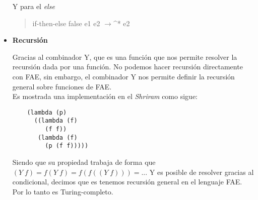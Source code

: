 \documentclass[12pt]{article}
\begin{document}
\begin{itemize}
  Y para el \textit{else} \\
  \begin{quote}
  if-then-else false e1 e2 $\to$^* \;\; e2\par
  \end{quote}
\item \textbf{Recursión}\par
  Gracias al combinador Y, que es una función que nos permite resolver la recursión dada por una función. No podemos hacer recursión directamente
  con FAE, sin embargo, el combinador Y nos permite definir la recursión general sobre funciones de FAE.\\
  Es mostrada una implementación en el \textit{Shriram} como sigue: \par
\begin{verbatim}
    (lambda (p)
      ((lambda (f)
         (f f))
       (lambda (f)
         (p (f f)))))
\end{verbatim}

Siendo que su propiedad trabaja de forma que $(Y\; f) = f(Y\; f) = f(f((Y\; f))) = ...$ Y es posible de resolver gracias al condicional, decimos que es tenemos recursión general en el lenguaje FAE. Por lo tanto es Turing-completo.
  
    
\end{itemize}
\end{document}
